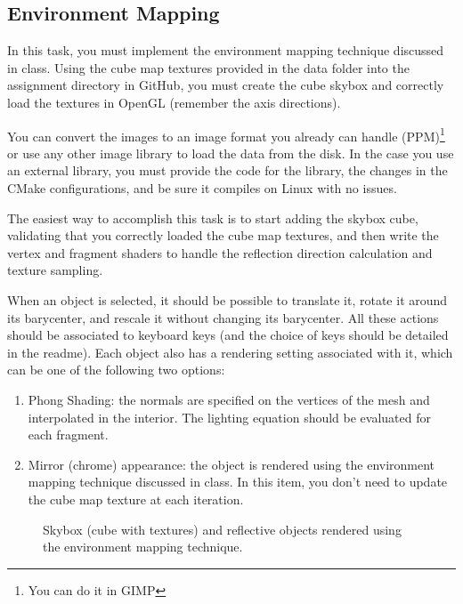 \documentclass[11pt]{article}
\begin{document}
\subsection{Environment Mapping}

In this task, you must implement the environment mapping technique discussed in class.
Using the cube map textures provided in the data folder into the assignment directory in GitHub, you must create the cube skybox and correctly load the textures in OpenGL (remember the axis directions). 

You can convert the images to an image format you already can handle (PPM)\footnote{You can do it in GIMP} or use any other image library to load the data from the disk. In the case you use an external library, you must provide the code for the library, the changes in the CMake configurations, and be sure it compiles on Linux with no issues.

The easiest way to accomplish this task is to start adding the skybox cube, validating that you correctly loaded the cube map textures, and then write the vertex and fragment shaders to handle the reflection direction calculation and texture sampling.

When an object is selected, it should be possible to translate it, rotate it around its barycenter, and rescale it without changing its barycenter. All these actions should be associated to keyboard keys (and the choice of keys should be detailed in the readme).
%
Each object also has a rendering setting associated with it, which can be one of the following two options:
\begin{enumerate}
	\item Phong Shading: the normals are specified on the vertices of the mesh and interpolated in the interior. The lighting equation should be evaluated for each fragment.
	\item Mirror (chrome) appearance: the object is rendered using the environment mapping technique discussed in class. In this item, you don't need to update the cube map texture at each iteration.
\end{enumerate}

\begin{figure}[tbh]
  \centering
  \caption{Skybox (cube with textures) and reflective objects rendered using the environment mapping technique.}
  \label{fig:env-mapping}
\end{figure}
\end{document}

